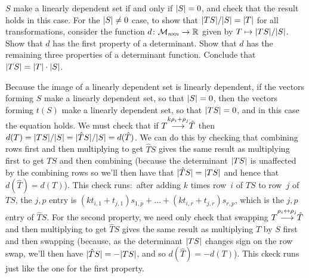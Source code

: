 \begin{exercises}
\begin{exparts}
        $S$ make a linearly dependent set if and only if 
        $\deter{S}=0$, and check that the result holds in this case.
      \partsitem For the $\deter{S}\neq 0$ case, to show that  
        $\deter{TS}/\deter{S}=\deter{T}$ for all transformations, consider
        the function
        \( \mbox{$d\colon \mathcal{M}_{n \! \times \! n}\to \mathbb{R}$} \) given by
        \( T\mapsto \deter{TS}/\deter{S} \).
        Show that $d$ has the first property of a determinant.
      \partsitem Show that $d$ has the remaining three properties of
        a determinant function.
      \partsitem Conclude that $\deter{TS}=\deter{T}\cdot\deter{S}$. 
    \end{exparts}
    \begin{answer}
      \begin{exparts}
        \partsitem Because the image of a linearly dependent set is 
          linearly dependent,
          if the vectors forming $S$ make a linearly dependent set, 
          so that $\deter{S}=0$,
          then the vectors forming $t(S)$ make a linearly dependent set,
          so that $\deter{TS}=0$, and in this case the equation holds.
        \partsitem We must check that if
          $T\smash[b]{\mathrel{ \mathop{\longrightarrow}\limits^{k\rho_i+\rho_j\mathstrut}_{ \begin{subarray}{l} \relax \end{subarray}}}}\hat{T}$ then 
          $d(T)=\deter{TS}/\deter{S}=\deter{\hat{T}S}/\deter{S}=d(\hat{T})$.
          We can do this by checking that combining rows first and
          then multiplying to get \( \hat{T}S \) gives the same result as
          multiplying first to get \( TS \) and then combining
          (because the determinant \( \deter{TS} \) is unaffected by the
          combining rows 
          so we'll then have that \( \deter{\hat{T}S}=\deter{TS} \) and
          hence that \( d(\hat{T})=d(T) \)).
          This check runs:~after adding 
          \( k \) times row~\( i \) of \( TS \) to
          row~$j$ of \( TS \), the \( j,p \) entry is
          \( (kt_{i,1}+t_{j,1})s_{1,p}+\dots+(kt_{i,r}+t_{j,r})s_{r,p} \),
          which is the \( j,p \) entry of \( \hat{T}S \).
        \partsitem For the second property, we need only check that swapping
          $T\smash[b]{\mathrel{ \mathop{\longrightarrow}\limits^{\rho_i\leftrightarrow\rho_j\mathstrut}_{ \begin{subarray}{l} \relax \end{subarray}}}}\hat{T}$
          and then multiplying to get \( \hat{T}S \) gives the same result as
          multiplying \( T \) by \( S \) first and then swapping 
          (because,
          as the determinant \( \deter{TS} \) changes sign on
          the row swap, we'll then have \( \deter{\hat{T}S}=-\deter{TS} \),
          and so \( d(\hat{T})=-d(T) \)). 
          This ckeck runs just like the one for the first property.


\end{exparts}
\end{answer}
\end{exercises}
